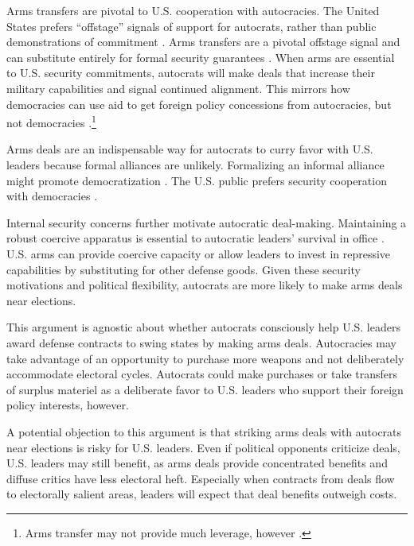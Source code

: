 \documentclass[12pt]{article}
\begin{document}
Arms transfers are pivotal to U.S. cooperation with autocracies.  
The United States prefers ``offstage'' signals of support for autocrats, rather than public demonstrations of commitment \citep{McManusYarhi-Milo2017}.
Arms transfers are a pivotal offstage signal and can substitute entirely for formal security guarantees \citep{Yarhi-Miloetal2016}. 
When arms are essential to U.S. security commitments, autocrats will make deals that increase their military capabilities and signal continued alignment.
This mirrors how democracies can use aid to get foreign policy concessions from autocracies, but not democracies \citep{BDMSmith2009}.\footnote{Arms transfer may not provide much leverage, however \citep{Spindel2023}.}


Arms deals are an indispensable way for autocrats to curry favor with U.S. leaders because formal alliances are unlikely.  
Formalizing an informal alliance might promote democratization \citep{GiblerWolford2006}.
The U.S. public prefers security cooperation with democracies \citep{Alley2023}. 


Internal security concerns further motivate autocratic deal-making. 
Maintaining a robust coercive apparatus is essential to autocratic leaders' survival in office \citep{Boix2008}. 
U.S. arms can provide coercive capacity or allow leaders to invest in repressive capabilities by substituting for other defense goods. 
Given these security motivations and political flexibility, autocrats are more likely to make arms deals near elections.


This argument is agnostic about whether autocrats consciously help U.S. leaders award defense contracts to swing states by making arms deals.
Autocracies may take advantage of an opportunity to purchase more weapons and not deliberately accommodate electoral cycles. 
Autocrats could make purchases or take transfers of surplus materiel as a deliberate favor to U.S. leaders who support their foreign policy interests, however. 


A potential objection to this argument is that striking arms deals with autocrats near elections is risky for U.S. leaders. 
Even if political opponents criticize deals, U.S. leaders may still benefit, as arms deals provide concentrated benefits and diffuse critics have less electoral heft.
Especially when contracts from deals flow to electorally salient areas, leaders will expect that deal benefits outweigh costs. 
\end{document}
